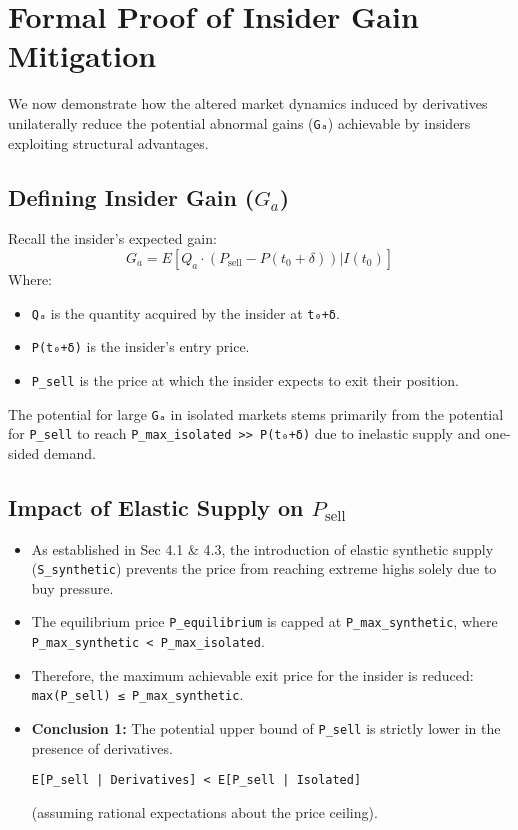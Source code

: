 \documentclass{article}
\begin{document}
\section{Formal Proof of Insider Gain Mitigation}

We now demonstrate how the altered market dynamics induced by derivatives unilaterally reduce the potential abnormal gains (\lstinline{Gₐ}) achievable by insiders exploiting structural advantages.

\subsection{Defining Insider Gain ($G_a$)}
Recall the insider's expected gain:
\[
G_a = E[Q_a \cdot (P_{\text{sell}} - P(t_0+\delta)) | I(t_0)]
\]
Where:
\begin{itemize}
    \item \lstinline{Qₐ} is the quantity acquired by the insider at \lstinline{t₀+δ}.
    \item \lstinline{P(t₀+δ)} is the insider's entry price.
    \item \lstinline{P_sell} is the price at which the insider expects to exit their position.
\end{itemize}
The potential for large \lstinline{Gₐ} in isolated markets stems primarily from the potential for \lstinline{P_sell} to reach \lstinline{P_max_isolated >> P(t₀+δ)} due to inelastic supply and one-sided demand.

\subsection{Impact of Elastic Supply on $P_{\text{sell}}$}
\begin{itemize}
    \item As established in Sec 4.1 & 4.3, the introduction of elastic synthetic supply (\lstinline{S_synthetic}) prevents the price from reaching extreme highs solely due to buy pressure.
    \item The equilibrium price \lstinline{P_equilibrium} is capped at \lstinline{P_max_synthetic}, where \lstinline{P_max_synthetic < P_max_isolated}.
    \item Therefore, the maximum achievable exit price for the insider is reduced: \lstinline{max(P_sell) ≤ P_max_synthetic}.
    \item \textbf{Conclusion 1:} The potential upper bound of \lstinline{P_sell} is strictly lower in the presence of derivatives.
    \begin{lstlisting}
E[P_sell | Derivatives] < E[P_sell | Isolated]
    \end{lstlisting}
    (assuming rational expectations about the price ceiling).
\end{itemize}
\end{document}
